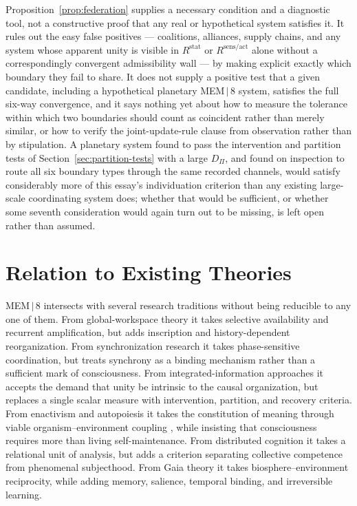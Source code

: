 \documentclass[11pt]{article}
\begin{document}
Proposition~\ref{prop:federation} supplies a necessary condition and a diagnostic tool, not a constructive proof that any real or hypothetical system satisfies it. It rules out the easy false positives --- coalitions, alliances, supply chains, and any system whose apparent unity is visible in $R^{\mathrm{stat}}$ or $R^{\mathrm{sens/act}}$ alone without a correspondingly convergent admissibility wall --- by making explicit exactly which boundary they fail to share. It does not supply a positive test that a given candidate, including a hypothetical planetary MEM\,$|$\,8 system, satisfies the full six-way convergence, and it says nothing yet about how to measure the tolerance within which two boundaries should count as coincident rather than merely similar, or how to verify the joint-update-rule clause from observation rather than by stipulation. A planetary system found to pass the intervention and partition tests of Section~\ref{sec:partition-tests} with a large $D_\Pi$, and found on inspection to route all six boundary types through the same recorded channels, would satisfy considerably more of this essay's individuation criterion than any existing large-scale coordinating system does; whether that would be sufficient, or whether some seventh consideration would again turn out to be missing, is left open rather than assumed.

\section{Relation to Existing Theories}

MEM\,$|$\,8 intersects with several research traditions without being reducible to any one of them. From global-workspace theory it takes selective availability and recurrent amplification, but adds inscription and history-dependent reorganization. From synchronization research it takes phase-sensitive coordination, but treats synchrony as a binding mechanism rather than a sufficient mark of consciousness. From integrated-information approaches it accepts the demand that unity be intrinsic to the causal organization, but replaces a single scalar measure with intervention, partition, and recovery criteria. From enactivism and autopoiesis it takes the constitution of meaning through viable organism--environment coupling \cite{thompson2004}, while insisting that consciousness requires more than living self-maintenance. From distributed cognition it takes a relational unit of analysis, but adds a criterion separating collective competence from phenomenal subjecthood. From Gaia theory it takes biosphere--environment reciprocity, while adding memory, salience, temporal binding, and irreversible learning.
\end{document}
